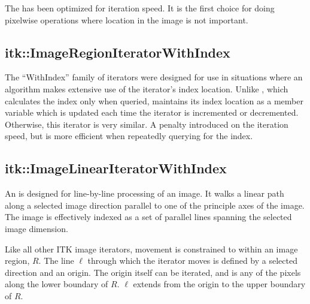 The  has been optimized for iteration speed.  It
is the first choice for doing pixelwise operations where location in the image
is not important.  

\subsection{itk::ImageRegionIteratorWithIndex}
\label{sec:itkImageRegionIteratorWithIndex}
The ``WithIndex'' family of iterators were designed for use in situations where
an algorithm makes extensive use of the iterator's index location. Unlike
, which calculates the index only when queried,
 maintains its index location as a member variable
which is updated each time the iterator is incremented or decremented.
Otherwise, this iterator is very similar.  A penalty introduced on the
iteration speed, but is more efficient when repeatedly querying for the index.




\subsection{itk::ImageLinearIteratorWithIndex}
\label{sec:itkImageLinearIteratorWithIndex}
An  is designed for line-by-line
processing of an image.  It walks a linear path along a selected image
direction parallel to one of the principle axes of the image. The image is
effectively indexed as a set of parallel lines spanning the selected image
dimension.

Like all other ITK image iterators, movement is constrained to within an image
region, $R$.  The line $\ell$ through which the iterator moves is defined by a
selected direction and an origin.  The origin itself can be iterated, and is
any of the pixels along the lower boundary of $R$.  $\ell$ extends from the
origin to the upper boundary of $R$.

